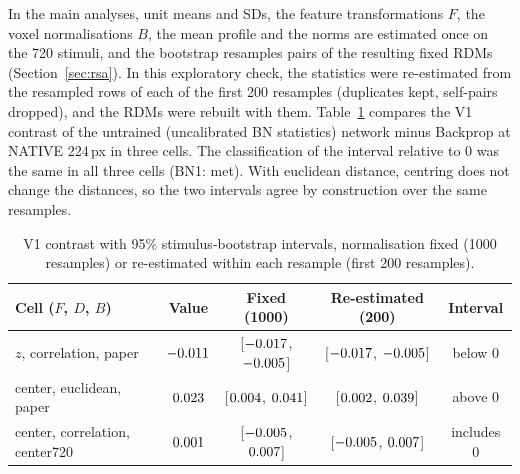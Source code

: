 In the main analyses, unit means and SDs, the feature transformations $F$, the voxel
normalisations $B$, the mean profile and the norms are estimated once on the 720 stimuli,
and the bootstrap resamples pairs of the resulting fixed RDMs (Section~\ref{sec:rsa}). In this
exploratory check, the statistics were re-estimated from the resampled rows of each of the
first 200 resamples (duplicates kept, self-pairs dropped), and the RDMs were rebuilt with
them. Table~\ref{tab:bootnorm} compares the V1 contrast of the untrained (uncalibrated BN
statistics) network minus Backprop at NATIVE 224\,px in three cells. The classification of
the interval relative to 0 was the same in all three cells (BN1: met). With euclidean
distance, centring does not change the distances, so the two intervals agree by construction
over the same resamples.

\begin{table}[h]
\centering
\footnotesize
\setlength{\tabcolsep}{3pt}
\begin{tabular}{@{}lcccc@{}}
\toprule
Cell ($F$, $D$, $B$) & Value & Fixed (1000) & Re-estimated (200) & Interval \\
\midrule
$z$, correlation, paper & $-0.011$ & [$-0.017$, $-0.005$] & [$-0.017$, $-0.005$] & below 0 \\
center, euclidean, paper & $0.023$ & [$0.004$, $0.041$] & [$0.002$, $0.039$] & above 0 \\
center, correlation, center720 & $0.001$ & [$-0.005$, $0.007$] & [$-0.005$, $0.007$] & includes 0 \\
\bottomrule
\end{tabular}
\caption{V1 contrast with 95\% stimulus-bootstrap intervals, normalisation fixed (1000
resamples) or re-estimated within each resample (first 200 resamples).}
\label{tab:bootnorm}
\end{table}
